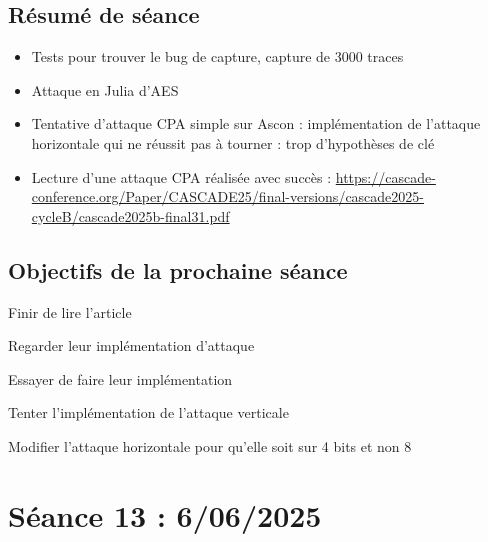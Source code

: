 \documentclass[12pt]{article}
\newcommand{\cmark}{\ding{51}}%
\newcommand{\xmark}{\ding{55}}%
\newcommand{\done}{\rlap{$\square$}{\raisebox{2pt}{\large\hspace{1pt}\cmark}}%
	\hspace{-2.5pt}}
\newcommand{\wontfix}{\rlap{$\square$}{\large\hspace{1pt}\xmark}}
\begin{document}
	\subsection{Résumé de séance}
	\begin{itemize}
		\item Tests pour trouver le bug de capture, capture de 3000 traces
		\item Attaque en Julia d'AES
		\item Tentative d'attaque CPA simple sur Ascon : implémentation de l'attaque horizontale qui ne réussit pas à tourner : trop d'hypothèses de clé
		\item Lecture d'une attaque CPA réalisée avec succès : \url{https://cascade-conference.org/Paper/CASCADE25/final-versions/cascade2025-cycleB/cascade2025b-final31.pdf}
	\end{itemize}
	
	\subsection{Objectifs de la prochaine séance}
	\begin{todolist}
		\item[\done] Finir de lire l'article
		\item[\wontfix] Regarder leur implémentation d'attaque
		\item[\done] Essayer de faire leur implémentation
		\item[\done] Tenter l'implémentation de l'attaque verticale
		\item[\done] Modifier l'attaque horizontale pour qu'elle soit sur 4 bits et non 8
	\end{todolist}
	
	
	\section{Séance 13 : 6/06/2025}
\end{document}

